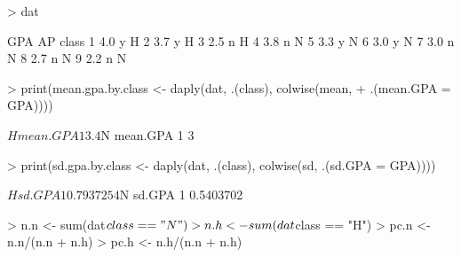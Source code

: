 \documentclass[12pt]{article}
\begin{document}
\begin{enumerate}
\begin{Schunk}
\begin{Sinput}
> dat
\end{Sinput}
\begin{Soutput}
  GPA AP class
1 4.0  y     H
2 3.7  y     H
3 2.5  n     H
4 3.8  n     N
5 3.3  y     N
6 3.0  y     N
7 3.0  n     N
8 2.7  n     N
9 2.2  n     N
\end{Soutput}
\begin{Sinput}
> print(mean.gpa.by.class <- daply(dat, .(class), colwise(mean, 
+     .(mean.GPA = GPA))))
\end{Sinput}
\begin{Soutput}
$H
  mean.GPA
1      3.4

$N
  mean.GPA
1        3
\end{Soutput}
\begin{Sinput}
> print(sd.gpa.by.class <- daply(dat, .(class), colwise(sd, .(sd.GPA = GPA))))
\end{Sinput}
\begin{Soutput}
$H
     sd.GPA
1 0.7937254

$N
     sd.GPA
1 0.5403702
\end{Soutput}
\begin{Sinput}
> n.n <- sum(dat$class == "N")
> n.h <- sum(dat$class == "H")
> pc.n <- n.n/(n.n + n.h)
> pc.h <- n.h/(n.n + n.h)
\end{Sinput}
\end{Schunk}
 
 
\end{enumerate}
\end{document}
